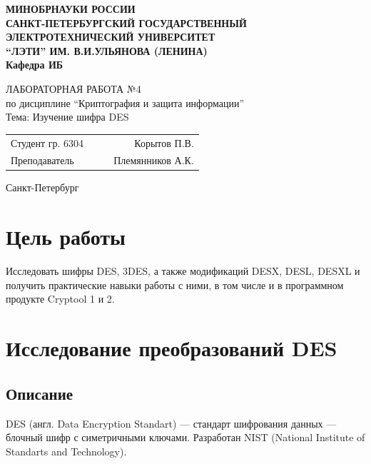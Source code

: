 \documentclass[a4paper, 14pt]{extarticle}
\begin{document}
\begin{titlepage}
    \centering
    {\bfseries
        \uppercase{
            Минобрнауки России \\
            Санкт-Петербургский государственный \\
            Электротехнический университет \\
            \enquote{ЛЭТИ} им. В.И.Ульянова (Ленина)\\
        }
        Кафедра ИБ

        \vspace{\fill}
        \uppercase{Лабораторная работа №4} \\
        по дисциплине \enquote{Криптография и защита информации} \\
        Тема: Изучение шифра DES
    }

    \vspace{\fill}
    \begin{tabularx}{0.8\textwidth}{l X c r}
        Студент гр. 6304 & & \underline{\hspace{3cm}} & Корытов П.В.\\
        Преподаватель & & \underline{\hspace{3cm}} & Племянников А.К.
    \end{tabularx}

    \vspace{1cm}
    Санкт-Петербург \\
    \the\year{}
\end{titlepage}

\newpage

\section*{Цель работы}
Исследовать шифры DES, 3DES, а также модификаций DESX, DESL, DESXL и получить практические навыки работы с ними, в том числе и в программном продукте Cryptool 1 и 2.

\section{Исследование преобразований DES}
\subsection{Описание}%
\label{sub:des_descr}
DES (англ. Data Encryption Standart) --- стандарт шифрования данных --- блочный шифр с симетричными ключами. Разработан NIST (National Institute of Standarts and Technology).
\end{document}
